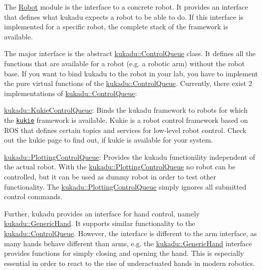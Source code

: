 The \hyperlink{group__Robot}{Robot} module is the interface to a concrete robot. It provides an interface that defines what kukadu expects a robot to be able to do. If this interface is implemented for a specific robot, the complete stack of the framework is available.

The major interface is the abstract \hyperlink{classkukadu_1_1ControlQueue}{kukadu\+::\+Control\+Queue} class. It defines all the functions that are available for a robot (e.\+g. a robotic arm) without the robot base. If you want to bind kukadu to the robot in your lab, you have to implement the pure virtual functions of the \hyperlink{classkukadu_1_1ControlQueue}{kukadu\+::\+Control\+Queue}. Currently, there exist 2 implementations of \hyperlink{classkukadu_1_1ControlQueue}{kukadu\+::\+Control\+Queue}\+:
\begin{DoxyItemize}
\item \hyperlink{classkukadu_1_1KukieControlQueue}{kukadu\+::\+Kukie\+Control\+Queue}\+: Binds the kukadu framework to robots for which the \href{https://iis.uibk.ac.at/intranet/projects/robot/armtopics}{\tt kukie} framework is available. Kukie is a robot control framework based on R\+OS that defines certain topics and services for low-\/level robot control. Check out the kukie page to find out, if kukie is available for your system.
\item \hyperlink{classkukadu_1_1PlottingControlQueue}{kukadu\+::\+Plotting\+Control\+Queue}\+: Provides the kukadu functionility independent of the actual robot. With the \hyperlink{classkukadu_1_1PlottingControlQueue}{kukadu\+::\+Plotting\+Control\+Queue} no robot can be controlled, but it can be used as dummy robot in order to test other functionality. The \hyperlink{classkukadu_1_1PlottingControlQueue}{kukadu\+::\+Plotting\+Control\+Queue} simply ignores all submitted control commands.
\end{DoxyItemize}

Further, kukadu provides an interface for hand control, namely \hyperlink{classkukadu_1_1GenericHand}{kukadu\+::\+Generic\+Hand}. It supports similar functionality to the \hyperlink{classkukadu_1_1ControlQueue}{kukadu\+::\+Control\+Queue}. However, the interface is different to the arm interface, as many hands behave different than arms, e.\+g. the \hyperlink{classkukadu_1_1GenericHand}{kukadu\+::\+Generic\+Hand} interface provides functions for simply closing and opening the hand. This is especially essential in order to react to the rise of underactuated hands in modern robotics.

